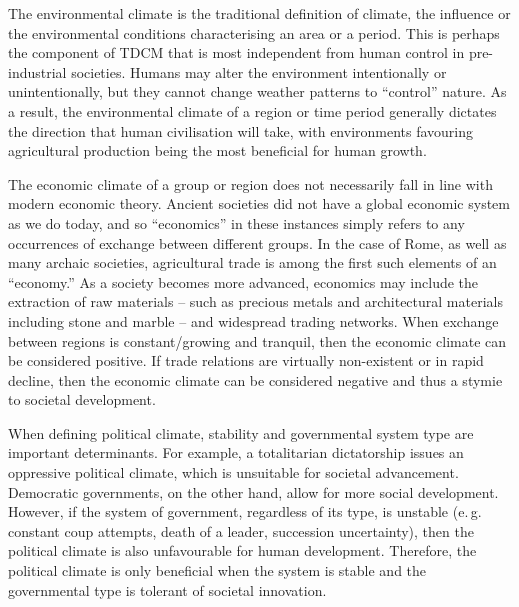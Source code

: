 The environmental climate is the traditional definition of climate, the influence or the environmental conditions characterising an area or a period. This is perhaps the component of TDCM that is most independent from human control in pre-industrial societies. Humans may alter the environment intentionally or unintentionally, but they cannot change weather patterns to “control” nature. As a result, the environmental climate of a region or time period generally dictates the direction that human civilisation will take, with environments favouring agricultural production being the most beneficial for human growth. 

The economic climate of a group or region does not necessarily fall in line with modern economic theory. Ancient societies did not have a global economic system as we do today, and so “economics” in these instances simply refers to any occurrences of exchange between different groups. In the case of Rome, as well as many archaic societies, agricultural trade is among the first such elements of an “economy.” As a society becomes more advanced, economics may include the extraction of raw materials – such as precious metals and architectural materials including stone and marble – and widespread trading networks. When exchange between regions is constant/growing and tranquil, then the economic climate can be considered positive. If trade relations are virtually non-existent or in rapid decline, then the economic climate can be considered negative and thus a stymie to societal development.

When defining political climate, stability and governmental system type are important determinants. For example, a totalitarian dictatorship issues an oppressive political climate, which is unsuitable for societal advancement. Democratic governments, on the other hand, allow for more social development. However, if the system of government, regardless of its type, is unstable (e.\,g. constant coup attempts, death of a leader, succession uncertainty), then the political climate is also unfavourable for human development. Therefore, the political climate is only beneficial when the system is stable and the governmental type is tolerant of societal innovation. 

